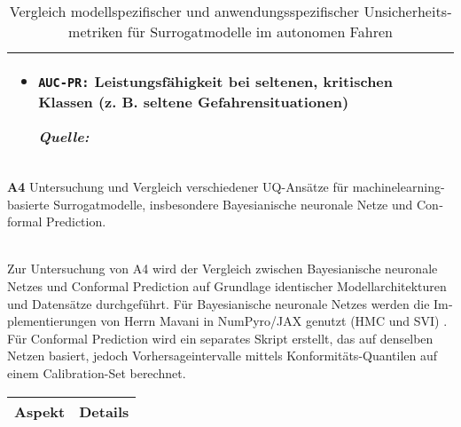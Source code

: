 \begin{otherlanguage}{ngerman}
\begin{table}[!htpb]
\begin{tabularx}{\textwidth}{|>{\centering\arraybackslash}l|X|X|}
\begin{itemize}[topsep=0em, itemsep=0em, leftmargin=*, label={}]
			\item \texttt{AUC-PR:} Leistungsfähigkeit bei seltenen, kritischen Klassen (z. B. seltene Gefahrensituationen) \par
			\begin{scriptsize}\textit{Quelle:} \parencite{ovadia2019can}\end{scriptsize}
		\end{itemize}
		\\
		\hline
		
	\end{tabularx}
	\caption{Vergleich modellspezifischer und anwendungsspezifischer Unsicherheitsmetriken für Surrogatmodelle im autonomen Fahren}
	\label{tab:chapter6r71}
\end{table}



\pagebreak


\textbf{A4} Untersuchung und Vergleich verschiedener UQ-Ansätze für \gls{machinelearning}-basierte Surrogatmodelle, insbesondere \gls{Bayesianische neuronale Netze} und \gls{Conformal Prediction}.
\par\noindent\\

Zur Untersuchung von A4 wird der Vergleich zwischen \gls{Bayesianische neuronale Netze}s und \gls{Conformal Prediction} auf Grundlage identischer Modellarchitekturen und Datensätze durchgeführt. Für \gls{Bayesianische neuronale Netze}s werden die Implementierungen von Herrn Mavani in NumPyro/JAX genutzt (HMC und SVI) \parencite{nmavani2025}. Für \gls{Conformal Prediction} wird ein separates Skript erstellt, das auf denselben Netzen basiert, jedoch Vorhersageintervalle mittels Konformitäts-Quantilen auf einem Calibration-Set berechnet.

\begin{table}[htbp]
  \centering
  \footnotesize
  \begin{tabularx}{\textwidth}{|l|X|}
  \hline
  \textbf{Aspekt} & \hspace{0.6em}\textbf{Details} \\ \hline


\end{tabularx}
\end{table}
\end{otherlanguage}
